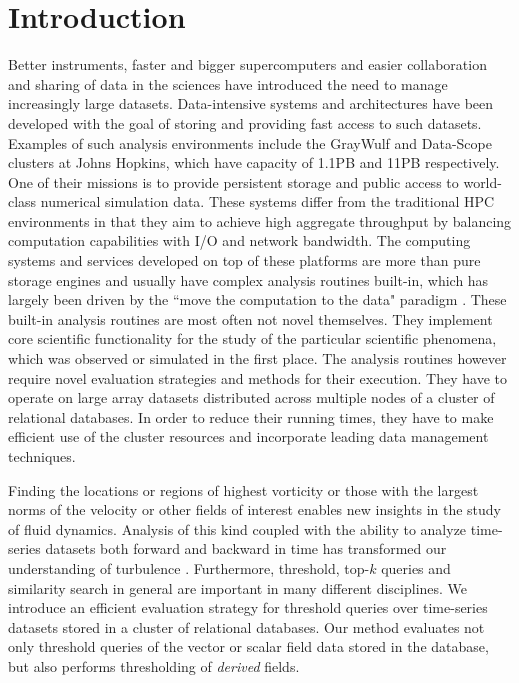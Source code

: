 \documentclass{sig-alternate}
\begin{document}
\section{Introduction}
Better instruments, faster and bigger supercomputers and easier collaboration and sharing of data in the sciences have introduced the need
to manage increasingly large datasets. Data-intensive systems and architectures have been developed with the goal of storing and providing
fast access to such datasets. Examples of such analysis environments include the GrayWulf and Data-Scope clusters \cite{Szalay, DataScope} at 
Johns Hopkins, which have capacity of 1.1PB and 11PB
respectively. One of their missions is to provide persistent storage and public access to world-class numerical simulation data. 
These systems differ from the traditional HPC environments in that they aim to achieve high aggregate throughput by balancing computation
capabilities with I/O and network bandwidth. The computing systems and services developed on top of these platforms are more than pure
storage engines and usually have complex analysis routines built-in, which has largely been driven by the ``move the computation to the data"
paradigm \cite{fourthparadigm}. These built-in analysis routines are most often not novel themselves. They implement core scientific functionality for the
study of the particular scientific phenomena, which was observed or simulated in the first place. The analysis routines however require novel evaluation
strategies and methods for their execution. They have to operate on large array datasets distributed across multiple nodes of a cluster of relational
databases. In order to reduce their running times, they have to make efficient use of the cluster resources and incorporate 
leading data management techniques.

Finding the locations or regions of highest vorticity or those with the largest norms of the velocity or other fields of interest
enables new insights in the study of fluid dynamics. Analysis of this kind coupled with the ability to analyze time-series datasets both 
forward and backward in time has transformed our understanding of turbulence \cite{Eyink}. Furthermore, threshold, top-$k$ queries and similarity search
in general are important in many different disciplines. We introduce an efficient evaluation strategy for threshold
queries over time-series datasets stored in a cluster of relational databases. Our method evaluates not only threshold queries of the vector or 
scalar field data stored in the database, but also performs thresholding of \emph{derived} fields. 
\end{document}
